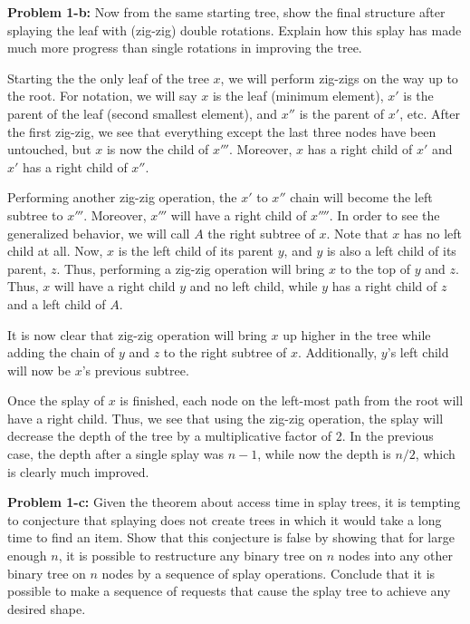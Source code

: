 \documentclass[psamsfonts]{amsart}
\newenvironment{sol}{\vspace{0.25cm}{\large \bfseries Solution:}}{\qedsymbol}
\newenvironment{prob}[1]{\begin{framed}{\large \bfseries Problem #1:}}{\end{framed}}
\begin{document}
\begin{prob}{1-b}
Now from the same starting tree, show the final structure after splaying the leaf with (zig-zig) double rotations. Explain how this splay has made much more progress than single rotations in improving the tree.
\end{prob}

\begin{sol}
Starting the the only leaf of the tree $x$, we will perform zig-zigs on the way up to the root. For notation, we will say $x$ is the leaf (minimum element), $x'$ is the parent of the leaf (second smallest element), and $x''$ is the parent of $x'$, etc. After the first zig-zig, we see that everything except the last three nodes have been untouched, but $x$ is now the child of $x'''$. Moreover, $x$ has a right child of $x'$ and $x'$ has a right child of $x''$. 

Performing another zig-zig operation, the $x'$ to $x''$ chain will become the left subtree to $x'''$. Moreover, $x'''$ will have a right child of $x''''$. In order to see the generalized behavior, we will call $A$ the right subtree of $x$. Note that $x$ has no left child at all. Now, $x$ is the left child of its parent $y$, and $y$ is also a left child of its parent, $z$. Thus, performing a zig-zig operation will bring $x$ to the top of $y$ and $z$. Thus, $x$ will have a right child $y$ and no left child, while $y$ has a right child of $z$ and a left child of $A$. 

It is now clear that zig-zig operation will bring $x$ up higher in the tree while adding the chain of $y$ and $z$ to the right subtree of $x$. Additionally, $y$'s left child will now be $x$'s previous subtree. 

Once the splay of $x$ is finished, each node on the left-most path from the root will have a right child. Thus, we see that using the zig-zig operation, the splay will decrease the depth of the tree by a multiplicative factor of $2$. In the previous case, the depth after a single splay was $n-1$, while now the depth is $n/2$, which is clearly much improved.
\end{sol}

\begin{prob}{1-c}
Given the theorem about access time in splay trees, it is tempting to conjecture that splaying does not create trees in which it would take a long time to find an item. Show that this conjecture is false by showing that for large enough $n$, it is possible to restructure any binary tree on $n$ nodes into any other binary tree on $n$ nodes by a sequence of splay operations. Conclude that it is possible to make a sequence of requests that cause the splay tree to achieve any desired shape.
\end{prob}
\end{document}
